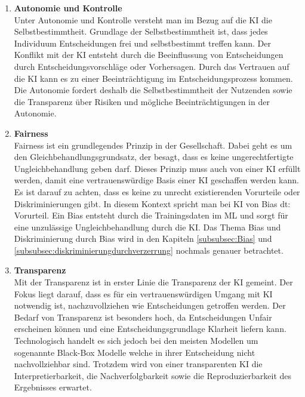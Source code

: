 \begin{onehalfspace}
        \begin{enumerate}
            \item \textbf{Autonomie und Kontrolle} \\
            Unter Autonomie und Kontrolle versteht man im Bezug auf die \ac*{KI} die Selbstbestimmtheit. Grundlage der Selbstbestimmtheit ist, dass jedes Individuum Entscheidungen frei und selbstbestimmt treffen kann. Der Konflikt mit der \ac*{KI} entsteht durch die Beeinflussung von Entscheidungen durch Entscheidungsvorschläge oder Vorhersagen. Durch das Vertrauen auf die \ac*{KI} kann es zu einer Beeinträchtigung im Entscheidungsprozess kommen. Die Autonomie fordert deshalb die Selbstbestimmtheit der Nutzenden sowie die Transparenz über Risiken und mögliche Beeinträchtigungen in der Autonomie.\cite{Cremers2019}\cite{Heesen2020}
            \item \textbf{Fairness} \\
            Fairness ist ein grundlegendes Prinzip in der Gesellschaft. Dabei geht es um den Gleichbehandlungsgrundsatz, der besagt, dass es keine ungerechtfertigte Ungleichbehandlung geben darf. Dieses Prinzip muss auch von einer \ac*{KI} erfüllt werden, damit eine vertrauenswürdige Basis einer \ac*{KI} geschaffen werden kann. Es ist darauf zu achten, dass es keine zu unrecht existierenden Vorurteile oder Diskriminierungen gibt. In diesem Kontext spricht man bei \ac*{KI} von Bias \glqq{}\ac*{dt}: Vorurteil\grqq{}. Ein Bias entsteht durch die Trainingsdaten im \ac*{ML} und sorgt für eine unzulässige Ungleichbehandlung durch die \ac*{KI}. Das Thema Bias und Diskriminierung durch Bias wird in den Kapiteln \ref*{subsubsec:Bias} und \ref*{subsubsec:diskriminierungdurchverzerrung} nochmals genauer betrachtet.\cite{Cremers2019}\cite{hagendorff2021blind}
            \item \textbf{Transparenz} \\
            Mit der Transparenz ist in erster Linie die Transparenz der \ac*{KI} gemeint. Der Fokus liegt darauf, dass es für ein vertrauenswürdigen Umgang mit \ac*{KI} notwendig ist, nachzuvollziehen wie Entscheidungen getroffen werden. Der Bedarf von Transparenz ist besonders hoch, da Entscheidungen Unfair erscheinen können und eine Entscheidungsgrundlage Klarheit liefern kann. Technologisch handelt es sich jedoch bei den meisten Modellen um sogenannte Black-Box Modelle welche in ihrer Entscheidung nicht nachvollziehbar sind. Trotzdem wird von einer transparenten \ac*{KI} die Interpretierbarkeit, die Nachverfolgbarkeit sowie die Reproduzierbarkeit des Ergebnisses erwartet.\cite{Cremers2019}\cite{Hallensleben2020}\cite{Heesen2020}

\end{enumerate}
\end{onehalfspace}
